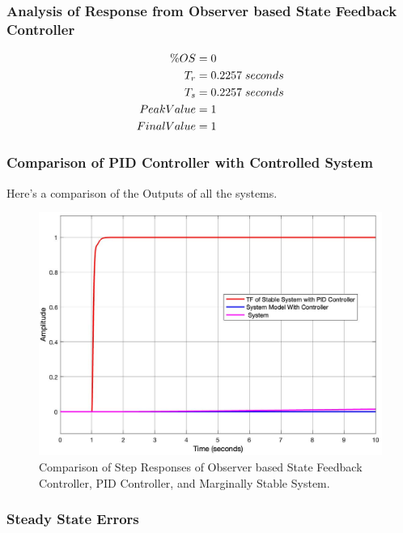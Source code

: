 \documentclass{article}
\begin{document}
\subsubsection{Analysis of Response from Observer based State Feedback Controller}
\begin{equation}\begin{aligned}
\%OS & = 0\\
T_r & = 0.2257 \;seconds \\
T_s & = 0.2257 \;seconds\\
Peak Value & = 1 \\
Final Value & = 1 \end{aligned} \notag \end{equation}\pagebreak
\subsubsection{Comparison of  PID Controller with Controlled System }
Here's a comparison of the Outputs of all the systems. 
\vskip10pt
\begin{figure}[h!]
\centering
\includegraphics[scale=0.25]{Comparison.jpg}
\caption{Comparison of Step Responses of Observer based State Feedback Controller, PID Controller, and Marginally Stable System.}
\end{figure}

\subsubsection{Steady State Errors}
\end{document}
